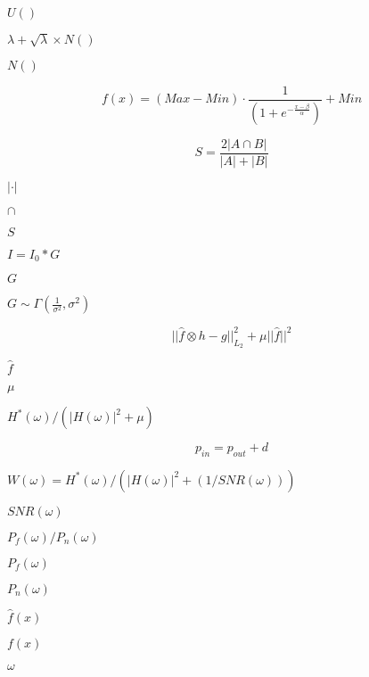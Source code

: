 \documentclass{article}
\begin{document}
$ U() $
\pagebreak

$ \lambda + \sqrt{\lambda} \times N()$
\pagebreak

$ N() $
\pagebreak

\[ f(x) = (Max-Min) \cdot \frac{1}{\left(1+e^{- \frac{ x - \beta }{\alpha}}\right)} + Min \]
\pagebreak

\[ S = \frac{2 | A \cap B |}{|A| + |B|} \]
\pagebreak

$|\cdot|$
\pagebreak

$\cap$
\pagebreak

$S$
\pagebreak

$ I = I_0 \ast G $
\pagebreak

$ G $
\pagebreak

$ G \sim \Gamma(\frac{1}{\sigma^2}, \sigma^2) $
\pagebreak

\[ ||\hat{f} \otimes h - g||_{L_2}^2 + \mu||\hat{f}||^2 \]
\pagebreak

$\hat{f}$
\pagebreak

$\mu$
\pagebreak

$H^*(\omega) / (|H(\omega)|^2 + \mu)$
\pagebreak

\[ p_{in} = p_{out} + d \]
\pagebreak

$W(\omega) = H^*(\omega) / (|H(\omega)|^2 + (1 / SNR(\omega)))$
\pagebreak

$SNR(\omega)$
\pagebreak

$P_f(\omega) / P_n(\omega)$
\pagebreak

$P_f(\omega)$
\pagebreak

$P_n(\omega)$
\pagebreak

$\hat{f}(x)$
\pagebreak

$f(x)$
\pagebreak

$\omega$
\pagebreak
\end{document}
